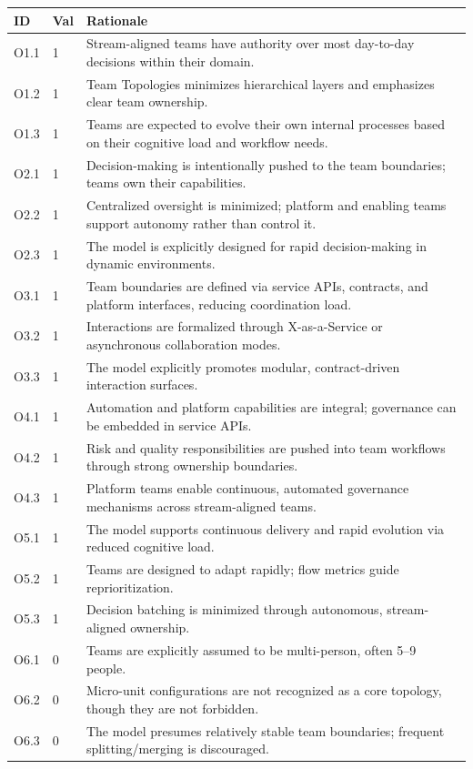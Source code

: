 \documentclass[11pt, a4paper, twocolumn]{article} %
\begin{document}
\begin{table}[h]
\centering
\begingroup\small
\setlength{\tabcolsep}{4pt}%
\begin{tabularx}{\linewidth}{llX}
\toprule
\textbf{ID} & \textbf{Val} & \textbf{Rationale} \\
\midrule
O1.1 & 1 &
Stream-aligned teams have authority over most day-to-day decisions within their domain. \\
O1.2 & 1 &
Team Topologies minimizes hierarchical layers and emphasizes clear team ownership. \\
O1.3 & 1 &
Teams are expected to evolve their own internal processes based on their cognitive load and workflow needs. \\
\midrule
O2.1 & 1 &
Decision-making is intentionally pushed to the team boundaries; teams own their capabilities. \\
O2.2 & 1 &
Centralized oversight is minimized; platform and enabling teams support autonomy rather than control it. \\
O2.3 & 1 &
The model is explicitly designed for rapid decision-making in dynamic environments. \\
\midrule
O3.1 & 1 &
Team boundaries are defined via service APIs, contracts, and platform interfaces, reducing coordination load. \\
O3.2 & 1 &
Interactions are formalized through X-as-a-Service or asynchronous collaboration modes. \\
O3.3 & 1 &
The model explicitly promotes modular, contract-driven interaction surfaces. \\
\midrule
O4.1 & 1 &
Automation and platform capabilities are integral; governance can be embedded in service APIs. \\
O4.2 & 1 &
Risk and quality responsibilities are pushed into team workflows through strong ownership boundaries. \\
O4.3 & 1 &
Platform teams enable continuous, automated governance mechanisms across stream-aligned teams. \\
\midrule
O5.1 & 1 &
The model supports continuous delivery and rapid evolution via reduced cognitive load. \\
O5.2 & 1 &
Teams are designed to adapt rapidly; flow metrics guide reprioritization. \\
O5.3 & 1 &
Decision batching is minimized through autonomous, stream-aligned ownership. \\
\midrule
O6.1 & 0 &
Teams are explicitly assumed to be multi-person, often 5–9 people. \\
O6.2 & 0 &
Micro-unit configurations are not recognized as a core topology, though they are not forbidden. \\
O6.3 & 0 &
The model presumes relatively stable team boundaries; frequent splitting/merging is discouraged. \\
\bottomrule
\end{tabularx}
\endgroup
\end{table}
\end{document}
